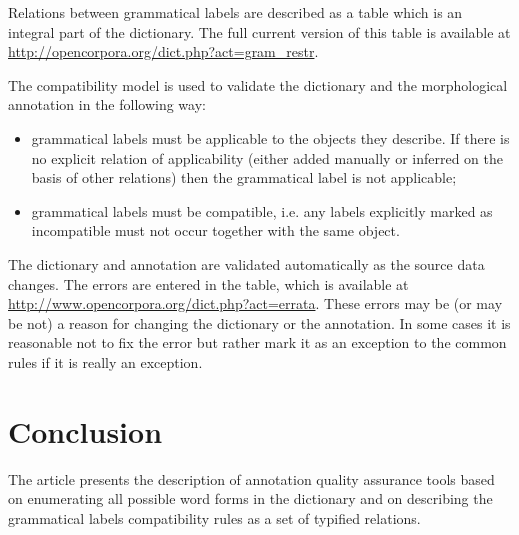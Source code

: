 \documentclass[a4paper]{article}
\begin{document}
Relations between grammatical labels are described as a table which is an integral part of the dictionary. The full current version of this table is available at \url{http://opencorpora.org/dict.php?act=gram_restr}.

The compatibility model is used to validate the dictionary and the morphological annotation in the following way:
\begin{itemize}
\item grammatical labels must be applicable to the objects they describe. If there is no explicit relation of applicability (either added manually or inferred on the basis of other relations) then the grammatical label is not applicable;
\item grammatical labels must be compatible, i.e. any labels explicitly marked as incompatible must not occur together with the same object.
\end{itemize}

The dictionary and annotation are validated automatically as the source data changes. The errors are entered in the table, which is available at \url{http://www.opencorpora.org/dict.php?act=errata}. These errors may be (or may be not) a reason for changing the dictionary or the annotation. In some cases it is reasonable not to fix the error but rather mark it as an exception to the common rules if it is really an exception.

\section{Conclusion}
The article presents the description of annotation quality assurance tools based on enumerating all possible word forms in the dictionary and on describing the grammatical labels compatibility rules as a set of typified relations.


\end{document}
